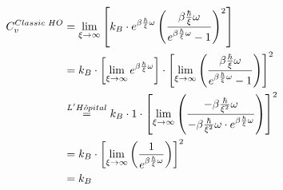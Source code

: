 \documentclass{article}
\numberwithin{equation}{subsection}
\begin{document}
\begin{enumerate}[label=\textbf{\Alph*.}]
\begin{enumerate}
        \begin{equation}
        \begin{split}
            C_v^{Classic \hspace{1mm} HO} &= \lim_{\xi\rightarrow\infty} \left[ k_B \cdot e^{\beta \frac{\hbar}{\xi} \omega} \left( \frac{\beta \frac{\hbar}{\xi} \omega}{ e^{\beta \frac{\hbar}{\xi} \omega} - 1} \right)^2 \right] 
            \\
            &=  k_B \cdot \left[ \lim_{\xi\rightarrow\infty} e^{\beta \frac{\hbar}{\xi} \omega} \right] \cdot \left[ \lim_{\xi\rightarrow\infty} \left(  \frac{\beta \frac{\hbar}{\xi} \omega}{ e^{\beta \frac{\hbar}{\xi} \omega} - 1} \right) \right]^2  
            \\
            &\overset{L'H\hat{o}pital}{=} k_B \cdot 1 \cdot \left[ \lim_{\xi\rightarrow\infty} \left(  \frac{- \beta \frac{\hbar}{\xi^2} \omega}{- \beta \frac{\hbar}{\xi^2} \omega \cdot e^{\beta \frac{\hbar}{\xi} \omega} } \right) \right]^2  
            \\
            &=  k_B \cdot \left[ \lim_{\xi\rightarrow\infty} \left(  \frac{1}{e^{\beta \frac{\hbar}{\xi} \omega} } \right) \right]^2  
            \\
            &= k_B
        \end{split}
        \end{equation}

    \end{enumerate}
\end{enumerate}
\end{document}
